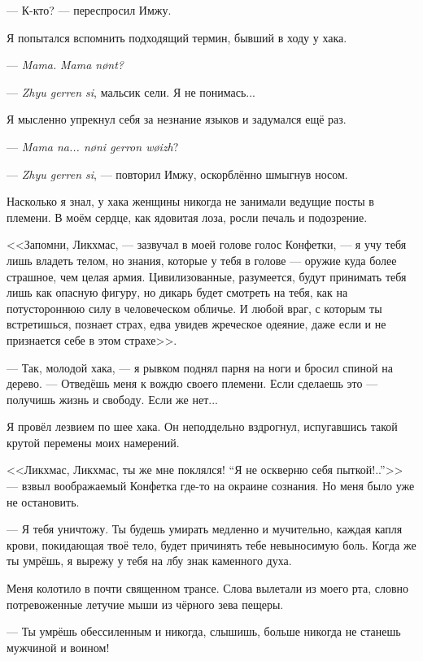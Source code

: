 --- К-кто? --- переспросил Имжу.

Я попытался вспомнить подходящий термин, бывший в ходу у хака.

--- \textit{Mama.}
\textit{Mama n\o{}nt?}

--- \textit{Zhyu gerren si}\FM, мальсик сели.
Я не понимась...

Я мысленно упрекнул себя за незнание языков и задумался ещё раз.

--- \textit{Mama na... n\o{}ni gerron w\o{}izh}\FM?

--- \textit{Zhyu gerren si}, --- повторил Имжу, оскорблённо шмыгнув носом.

Насколько я знал, у хака женщины никогда не занимали ведущие посты в племени.
В моём сердце, как ядовитая лоза, росли печаль и подозрение.

<<Запомни, Ликхмас, --- зазвучал в моей голове голос Конфетки, --- я учу тебя лишь владеть телом, но знания, которые у тебя в голове --- оружие куда более страшное, чем целая армия.
Цивилизованные, разумеется, будут принимать тебя лишь как опасную фигуру, но дикарь будет смотреть на тебя, как на потустороннюю силу в человеческом обличье.
И любой враг, с которым ты встретишься, познает страх, едва увидев жреческое одеяние, даже если и не признается себе в этом страхе>>.

--- Так, молодой хака, --- я рывком поднял парня на ноги и бросил спиной на дерево.
--- Отведёшь меня к вождю своего племени.
Если сделаешь это --- получишь жизнь и свободу.
Если же нет...

Я провёл лезвием по шее хака. Он неподдельно вздрогнул, испугавшись такой крутой перемены моих намерений.

<<Ликхмас, Ликхмас, ты же мне поклялся!
``Я не оскверню себя пыткой!..''>> --- взвыл воображаемый Конфетка где-то на окраине сознания.
Но меня было уже не остановить.

--- Я тебя уничтожу.
Ты будешь умирать медленно и мучительно, каждая капля крови, покидающая твоё тело, будет причинять тебе невыносимую боль.
Когда же ты умрёшь, я вырежу у тебя на лбу знак каменного духа.

Меня колотило в почти священном трансе.
Слова вылетали из моего рта, словно потревоженные летучие мыши из чёрного зева пещеры.

--- Ты умрёшь обессиленным и никогда, слышишь, больше никогда не станешь мужчиной и воином!

